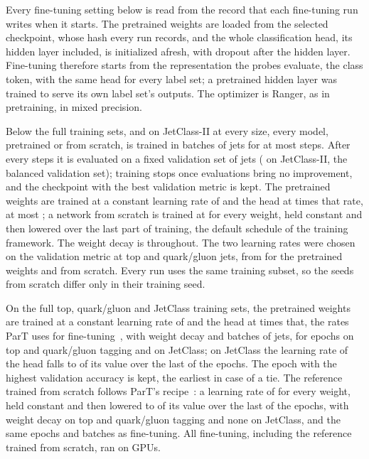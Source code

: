\documentclass[11pt]{article}
\begin{document}
Every fine-tuning setting below is read from the record that each fine-tuning run writes when it
starts. The pretrained weights are loaded from the selected checkpoint, whose hash every run records,
and the whole classification head, its hidden layer included, is initialized afresh, with dropout
\MlstFtHeadDropout{} after the hidden layer. Fine-tuning therefore starts from the representation the
probes evaluate, the class token, with the same head for every label set; a pretrained hidden layer
was trained to serve its own label set's outputs. The optimizer is Ranger, as in pretraining, in mixed
precision.

Below the full training sets, and on JetClass-II at every size, every model, pretrained or from
scratch, is trained in batches of \FtBudgetBatch{} jets for at most \FtBudgetSteps{} steps. After
every \FtBudgetEval{} steps it is evaluated on a fixed validation set of \FtValJets{} jets
(\FtValJetsBal{} on JetClass-II, the balanced validation set); training stops once
\FtBudgetPatience{} evaluations bring no improvement, and the checkpoint with the best validation
metric is kept. The pretrained weights are trained at a constant learning rate of \FtLrPre{} and the
head at \FtHeadMult{} times that rate, at most \FtHeadCap; a network from scratch is trained at
\FtLrScratch{} for every weight, held constant and then lowered over the last part of training, the
default schedule of the training framework. The weight decay is \FtBudgetWeightDecay{} throughout.
The two learning rates were chosen on the validation metric at \FtSweepN{} top and quark/gluon jets,
from \FtSweepPre{} for the pretrained weights and \FtSweepScratch{} from scratch. Every run uses the
same training subset, so the seeds from scratch differ only in their training seed.

On the full top, quark/gluon and JetClass training sets, the pretrained weights are trained at a
constant learning rate of \MlstFtLr{} and the head at \MlstFtHeadMult{} times that, the rates ParT
uses for fine-tuning~\cite[Sec.~5.2]{part}, with weight decay \MlstFtWeightDecay{} and batches of
\MlstFtBatch{} jets, for \MlstFtBenchEpochs{} epochs on top and quark/gluon tagging and
\MlstFtEpochsESix{} on JetClass; on JetClass the learning rate of the head falls to
\MlstFtHeadDecayTo{} of its value over the last \MlstFtHeadDecayShare{} of the epochs. The epoch with
the highest validation accuracy is kept, the earliest in case of a tie. The reference trained from
scratch follows ParT's recipe~\cite[Secs.~5.1 and~5.2]{part}: a learning rate of \MlstFtRefLr{} for
every weight, held constant and then lowered to \MlstFtHeadDecayTo{} of its value over the last
\MlstFtHeadDecayShare{} of the epochs, with weight decay \MlstFtRefWeightDecayBench{} on top and
quark/gluon tagging and none on JetClass, and the same epochs and batches as fine-tuning. All
fine-tuning, including the reference trained from scratch, ran on \MlstFtGpuTypes{} GPUs.
\end{document}
